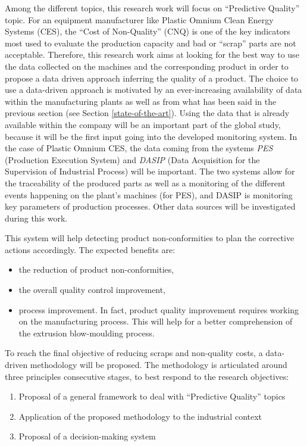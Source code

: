 %
Among the different topics, this research work will focus on ``Predictive Quality'' topic. For an equipment manufacturer like Plastic Omnium Clean Energy Systems (CES), the “Cost of Non-Quality” (CNQ) is one of the key indicators most used to evaluate the production capacity and bad or ``scrap'' parts are not acceptable. Therefore, this research work aims at looking for the best way to use the data collected  on the machines and the corresponding product in order to propose a data driven approach inferring the quality of a product. The choice to use a data-driven approach is motivated by an ever-increasing availability of data within the manufacturing plants as well as from what has been said in the previous section (see Section \ref{state-of-the-art}). Using the data that is already available within the company will be an important part of the global study, because it will be the first input going into the developed monitoring system. In the case of Plastic Omnium CES, the data coming from the systems \textit{PES} (Production Execution System) and \textit{DASIP} (Data Acquisition for the Supervision of Industrial Process) will be important. The two systems allow for the traceability of the produced parts as well as a monitoring of the different events happening on the plant’s machines (for PES), and DASIP is monitoring key parameters of production processes. Other data sources will be investigated during this work.

This system will help detecting product non-conformities to plan the corrective actions accordingly. The expected benefits are:

\begin{itemize}
    \item the reduction of product non-conformities, 
    \item the overall quality control improvement,
    \item process improvement. In fact, product quality improvement requires working on the manufacturing process. This will help for a better comprehension of the extrusion blow-moulding process. 
\end{itemize}

To reach the final objective of reducing scraps and non-quality costs, a data-driven methodology will be proposed. The methodology is articulated around three principles consecutive stages, to best respond to the research objectives:

\begin{enumerate}
    \item Proposal of a general framework to deal with ``Predictive Quality'' topics 
    \item Application of the proposed methodology to the industrial context
    \item Proposal of a decision-making system 
\end{enumerate}

